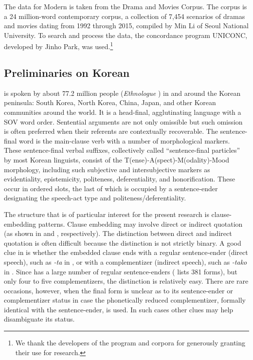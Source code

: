 \documentclass[output=paper,colorlinks,citecolor=brown]{langscibook}
\begin{document}
The data for Modern  is taken from the Drama and Movies Corpus. The corpus is a 24 million-word contemporary corpus, a collection of 7,454 scenarios of dramas and movies dating from 1992 through 2015, compiled by Min Li of Seoul National University. To search and process the data, the  concordance program UNICONC, developed by Jinho Park, was used.\footnote{We thank the developers of the program and corpora for generously granting their use for research.}


\subsection{Preliminaries on Korean}
\label{subsec:preliminaries}

 is spoken by about 77.2 million people (\textit{Ethnologue} \citealt{SimonsFennig2018}) in and around the Korean peninsula: South Korea, North Korea, China, Japan, and other Korean communities around the world. It is a head-final, agglutinating language with a SOV word order. Sentential arguments are not only omissible but such omission is often preferred when their referents are contextually recoverable. The sentence-final word is the main-clause verb with a number of morphological markers. These sentence-final verbal suffixes, collectively called ``sentence-final particles'' by most Korean linguists, consist of the T(ense)-A(spect)-M(odality)-Mood morphology, including such subjective and intersubjective markers as evidentiality, epistemicity, politeness, deferentiality, and honorification. These occur in ordered slots, the last of which is occupied by a sentence-ender designating the speech-act type and politeness/deferentiality.

The structure that is of particular interest for the present research is clause-embedding patterns. Clause embedding may involve direct or indirect quotation (as shown in  and , respectively). The distinction between direct and indirect quotation is often difficult because the distinction is not strictly binary. A good clue in  is whether the embedded clause ends with a regular sentence-ender (direct speech), such as \textit{-ta} in , or with a complementizer (indirect speech), such as \textit{-tako} in . Since  has a large number of regular sentence-enders (\citealt[147--151]{Kim2001} lists 381 forms), but only four to five complementizers, the distinction is relatively easy. There are rare occasions, however, when the final form is unclear as to its sentence-ender or complementizer status in case the phonetically reduced complementizer, formally identical with the sentence-ender, is used. In such cases other clues may help disambiguate its status.
\end{document}

